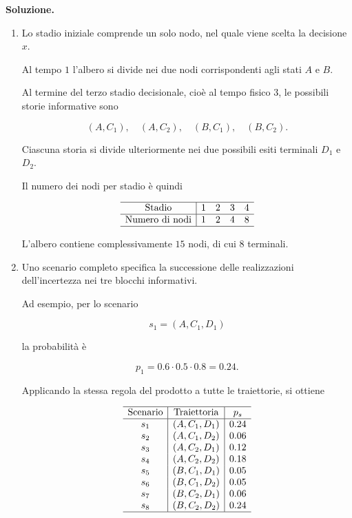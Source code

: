\noindent
\textbf{Soluzione.}

\begin{enumerate}

\item Lo stadio iniziale comprende un solo nodo,
nel quale viene scelta la decisione $x$.

Al tempo $1$ l'albero si divide nei due nodi
corrispondenti agli stati $A$ e $B$.

Al termine del terzo stadio decisionale,
cio\`e al tempo fisico $3$,
le possibili storie informative sono

\[
(A,C_1),\quad
(A,C_2),\quad
(B,C_1),\quad
(B,C_2).
\]

Ciascuna storia si divide ulteriormente
nei due possibili esiti terminali
$D_1$ e $D_2$.

Il numero dei nodi per stadio \`e
quindi

\[
\begin{array}{c|cccc}
\hline
\text{Stadio} & 1&2&3&4\\
\hline
\text{Numero di nodi} &1&2&4&8\\
\hline
\end{array}
\]

L'albero contiene complessivamente
$15$ nodi, di cui $8$ terminali.

\item Uno scenario completo specifica
la successione delle realizzazioni
dell'incertezza nei tre blocchi informativi.

Ad esempio, per lo scenario

\[
s_1=(A,C_1,D_1)
\]

la probabilit\`a \`e

\[
p_1
=
0.6\cdot0.5\cdot0.8
=
0.24.
\]

Applicando la stessa regola del prodotto
a tutte le traiettorie, si ottiene

\[
\begin{array}{c|c|c}
\hline
\text{Scenario}
&
\text{Traiettoria}
&
p_s\\
\hline
s_1&(A,C_1,D_1)&0.24\\
s_2&(A,C_1,D_2)&0.06\\
s_3&(A,C_2,D_1)&0.12\\
s_4&(A,C_2,D_2)&0.18\\
s_5&(B,C_1,D_1)&0.05\\
s_6&(B,C_1,D_2)&0.05\\
s_7&(B,C_2,D_1)&0.06\\
s_8&(B,C_2,D_2)&0.24\\
\hline
\end{array}
\]


\end{enumerate}
